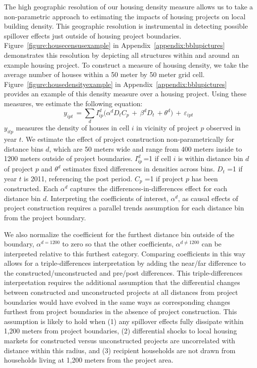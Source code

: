 \documentclass[12pt]{article}
\begin{document}
The high geographic resolution of our housing density measure allows us to take a non-parametric approach to estimating the impacts of housing projects on local building density.  This geographic resolution is instrumental in detecting possible spillover effects just outside of housing project boundaries.  Figure~\ref{figure:housecensusexample} in Appendix~\ref{appendix:bblupictures} demonstrates this resolution by depicting all structures within and around an example housing project.  To construct a measure of housing density, we take the average number of houses within a 50 meter by 50 meter grid cell.  Figure~\ref{figure:housedensityexample} in Appendix~\ref{appendix:bblupictures} provides an example of this density measure over a housing project.  Using these measures, we estimate the following equation:
\begin{equation}
\label{equation:bblu}
y_{ipt} \, = \sum\limits_{d} I^d_{ip}\Big( \alpha^d D_tC_p \, + \, \beta^dD_t \, + \theta^{d} \Big) \, + \, \varepsilon_{ipt}
\end{equation}
$y_{itp}$ measures the density of houses in cell $i$ in vicinity of project $p$ observed in year $t$.  We estimate the effect of project construction non-parametrically for distance bins $d$, which are 50 meters wide and range from 400 meters inside to 1200 meters outside of project boundaries.  $I^d_{ip}$\,=1 if cell $i$ is within distance bin $d$ of project $p$ and $\theta^{d}$ estimates fixed differences in densities across bins.  $D_{t}\,\,$=1 if year $t$ is 2011, referencing the post period.  $C_{p}\,\,$=1 if project $p$ has been constructed.  Each $\alpha^d$ captures the differences-in-differences effect for each distance bin $d$.  Interpreting the coefficients of interest, $\alpha^d$, as causal effects of project construction requires a parallel trends assumption for each distance bin from the project boundary.  

We also normalize the coefficient for the furthest distance bin outside of the boundary, $\alpha^{d=1200}$ to zero so that the other coefficients, $\alpha^{d \neq 1200}$ can be interpreted relative to this furthest category.  Comparing coefficients in this way allows for a triple-differences interpretation by adding the near/far difference to the constructed/unconstructed and pre/post differences.  This triple-differences interpretation requires the additional assumption that the differential changes between constructed and unconstructed projects at all distances from project boundaries would have evolved in the same ways as corresponding changes furthest from project boundaries in the absence of project construction.  This assumption is likely to hold when (1) any spillover effects fully dissipate within 1,200 meters from project boundaries, (2) differential shocks to local housing markets for constructed versus unconstructed projects are uncorrelated with distance within this radius, and (3) recipient households are not drawn from households living at 1,200 meters from the project area.
\end{document}

